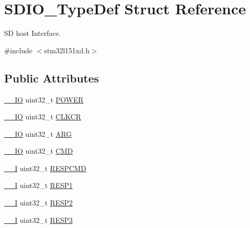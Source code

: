 \hypertarget{struct_s_d_i_o___type_def}{\section{S\-D\-I\-O\-\_\-\-Type\-Def Struct Reference}
\label{struct_s_d_i_o___type_def}
}


S\-D host Interface.  




{\ttfamily \#include $<$stm32l151xd.\-h$>$}

\subsection*{Public Attributes}
\begin{DoxyCompactItemize}
\item 
\hyperlink{core__sc300_8h_aec43007d9998a0a0e01faede4133d6be}{\-\_\-\-\_\-\-I\-O} uint32\-\_\-t \hyperlink{struct_s_d_i_o___type_def_a7c156bc55f6d970a846a459d57a9e940}{P\-O\-W\-E\-R}
\item 
\hyperlink{core__sc300_8h_aec43007d9998a0a0e01faede4133d6be}{\-\_\-\-\_\-\-I\-O} uint32\-\_\-t \hyperlink{struct_s_d_i_o___type_def_aeb1e30ce2038628e45264f75e5e926bb}{C\-L\-K\-C\-R}
\item 
\hyperlink{core__sc300_8h_aec43007d9998a0a0e01faede4133d6be}{\-\_\-\-\_\-\-I\-O} uint32\-\_\-t \hyperlink{struct_s_d_i_o___type_def_a3e24392875e98cd09043e54a0990ab7a}{A\-R\-G}
\item 
\hyperlink{core__sc300_8h_aec43007d9998a0a0e01faede4133d6be}{\-\_\-\-\_\-\-I\-O} uint32\-\_\-t \hyperlink{struct_s_d_i_o___type_def_abbbdc3174e12dab21123d746d65f345d}{C\-M\-D}
\item 
\hyperlink{core__sc300_8h_af63697ed9952cc71e1225efe205f6cd3}{\-\_\-\-\_\-\-I} uint32\-\_\-t \hyperlink{struct_s_d_i_o___type_def_a9d881ed6c2fdecf77e872bcc6b404774}{R\-E\-S\-P\-C\-M\-D}
\item 
\hyperlink{core__sc300_8h_af63697ed9952cc71e1225efe205f6cd3}{\-\_\-\-\_\-\-I} uint32\-\_\-t \hyperlink{struct_s_d_i_o___type_def_a2b6f1ca5a5a50f8ef5417fe7be22553c}{R\-E\-S\-P1}
\item 
\hyperlink{core__sc300_8h_af63697ed9952cc71e1225efe205f6cd3}{\-\_\-\-\_\-\-I} uint32\-\_\-t \hyperlink{struct_s_d_i_o___type_def_a9228c8a38c07c508373644220dd322f0}{R\-E\-S\-P2}
\item 
\hyperlink{core__sc300_8h_af63697ed9952cc71e1225efe205f6cd3}{\-\_\-\-\_\-\-I} uint32\-\_\-t \hyperlink{struct_s_d_i_o___type_def_a70f3e911570bd326bff852664fd8a7d5}{R\-E\-S\-P3}

\end{DoxyCompactItemize}
